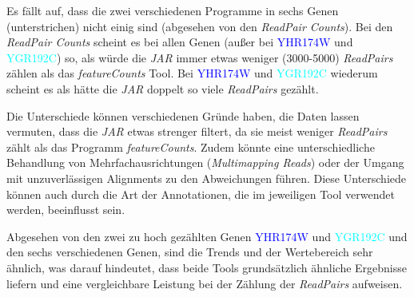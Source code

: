 \documentclass[12pt]{article}
\begin{document}
Es fällt auf, dass die zwei verschiedenen Programme in
sechs Genen (unterstrichen) nicht einig sind (abgesehen von den \textit{ReadPair Counts}).
Bei den \textit{ReadPair Counts} scheint es bei allen Genen (au\ss er bei \textcolor{blue}{YHR174W} und \textcolor{cyan}{YGR192C}) so, als würde die \textit{JAR} immer 
etwas weniger (3000-5000) \textit{ReadPairs} zählen  als das \textit{featureCounts} Tool.
Bei  \textcolor{blue}{YHR174W} und \textcolor{cyan}{YGR192C} wiederum scheint es als hätte die 
\textit{JAR} doppelt so viele \textit{ReadPairs} gezählt.

Die Unterschiede können verschiedenen Gründe haben, die Daten lassen vermuten, dass die \textit{JAR} etwas strenger filtert, da sie meist
weniger \textit{ReadPairs} zählt als das Programm \textit{featureCounts}.
Zudem könnte eine unterschiedliche Behandlung von Mehrfachausrichtungen (\textit{Multimapping Reads}) oder der 
Umgang mit unzuverlässigen Alignments zu den Abweichungen führen. 
Diese Unterschiede können auch durch die Art der Annotationen, die im jeweiligen Tool verwendet werden, beeinflusst sein.

Abgesehen von den zwei zu hoch gezählten Genen \textcolor{blue}{YHR174W} und \textcolor{cyan}{YGR192C}
und den sechs verschiedenen Genen, sind die Trends und der Wertebereich sehr ähnlich, was
darauf hindeutet, dass beide Tools grundsätzlich ähnliche Ergebnisse liefern 
und eine vergleichbare Leistung bei der Zählung der \textit{ReadPairs} aufweisen.
\end{document}
